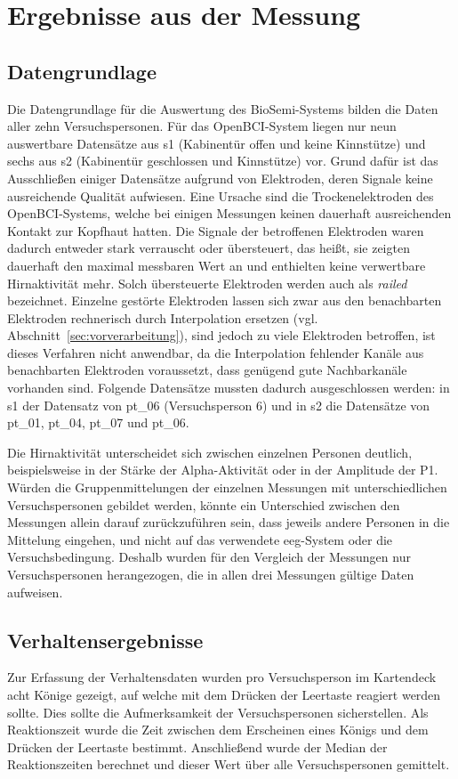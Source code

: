 \chapter{Ergebnisse aus der Messung}
\section{Datengrundlage}
\label{sec:datengrundlage}
Die Datengrundlage für die Auswertung des BioSemi-Systems bilden die Daten aller zehn Versuchspersonen. Für das OpenBCI-System liegen nur neun auswertbare Datensätze aus
s1 (Kabinentür offen und keine Kinnstütze) und sechs aus s2
(Kabinentür geschlossen und Kinnstütze) vor. Grund dafür ist das Ausschließen einiger
Datensätze aufgrund von Elektroden, deren Signale keine ausreichende Qualität
aufwiesen. Eine Ursache sind die Trockenelektroden des OpenBCI-Systems, welche
bei einigen Messungen keinen dauerhaft ausreichenden Kontakt zur Kopfhaut
hatten. Die Signale der betroffenen Elektroden waren dadurch entweder stark
verrauscht oder übersteuert, das heißt, sie zeigten dauerhaft den maximal
messbaren Wert an und enthielten keine verwertbare Hirnaktivität mehr. Solch
übersteuerte Elektroden werden auch als \textit{railed} bezeichnet. Einzelne
gestörte Elektroden lassen sich zwar aus den benachbarten Elektroden
rechnerisch durch Interpolation ersetzen (vgl. Abschnitt~\ref{sec:vorverarbeitung}), sind jedoch
zu viele Elektroden betroffen, ist dieses Verfahren nicht anwendbar, da die
Interpolation fehlender Kanäle aus benachbarten Elektroden voraussetzt, dass
genügend gute Nachbarkanäle vorhanden sind. Folgende Datensätze mussten
dadurch ausgeschlossen werden: in s1 der Datensatz von
pt\_06 (Versuchsperson 6) und in s2 die Datensätze von pt\_01, pt\_04,
pt\_07 und pt\_06.

Die Hirnaktivität unterscheidet sich zwischen einzelnen Personen deutlich,
beispielsweise in der Stärke der Alpha-Aktivität oder in der Amplitude der P1. Würden die Gruppenmittelungen der einzelnen Messungen mit unterschiedlichen
Versuchspersonen gebildet werden, könnte ein Unterschied zwischen den Messungen allein
darauf zurückzuführen sein, dass jeweils andere Personen in die Mittelung eingehen, und
nicht auf das verwendete \acrshort{eeg}-System oder die Versuchsbedingung. Deshalb wurden für den Vergleich der Messungen nur Versuchspersonen herangezogen, die
in allen drei Messungen gültige Daten aufweisen. 

\section{Verhaltensergebnisse}
Zur Erfassung der Verhaltensdaten wurden pro Versuchsperson im Kartendeck acht
Könige gezeigt, auf welche mit dem Drücken der Leertaste reagiert werden
sollte. Dies sollte die Aufmerksamkeit der Versuchspersonen sicherstellen. Als
Reaktionszeit wurde die Zeit zwischen dem Erscheinen eines Königs und dem
Drücken der Leertaste bestimmt. Anschließend wurde der Median der
Reaktionszeiten berechnet und dieser Wert über alle Versuchspersonen gemittelt.

